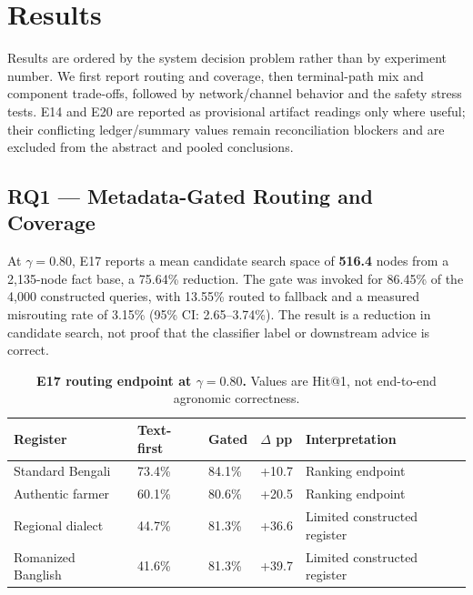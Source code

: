 \documentclass[11pt,a4paper]{article}
\begin{document}
\section{Results}
\label{sec:results}

Results are ordered by the system decision problem rather than by experiment number. We first report routing and coverage, then terminal-path mix and component trade-offs, followed by network/channel behavior and the safety stress tests. E14 and E20 are reported as provisional artifact readings only where useful; their conflicting ledger/summary values remain reconciliation blockers and are excluded from the abstract and pooled conclusions.

\subsection{RQ1 --- Metadata-Gated Routing and Coverage}
\label{subsec:e17}
At $\gamma=0.80$, E17 reports a mean candidate search space of \textbf{516.4} nodes from a 2{,}135-node fact base, a 75.64\% reduction. The gate was invoked for 86.45\% of the 4{,}000 constructed queries, with 13.55\% routed to fallback and a measured misrouting rate of 3.15\% (95\% CI: 2.65--3.74\%). The result is a reduction in candidate search, not proof that the classifier label or downstream advice is correct.

\begin{table}[t]
\centering
\small
\caption{\textbf{E17 routing endpoint at $\gamma=0.80$.} Values are Hit@1, not end-to-end agronomic correctness.}
\label{tab:e17}
\begin{tabularx}{\textwidth}{@{} L{3.1cm} C{1.8cm} C{1.8cm} C{1.6cm} Y @{}}
\toprule
\textbf{Register} & \textbf{Text-first} & \textbf{Gated} & \textbf{$\Delta$ pp} & \textbf{Interpretation} \\
\midrule
Standard Bengali & 73.4\% & 84.1\% & +10.7 & Ranking endpoint \\
Authentic farmer & 60.1\% & 80.6\% & +20.5 & Ranking endpoint \\
Regional dialect & 44.7\% & 81.3\% & +36.6 & Limited constructed register \\
Romanized Banglish & 41.6\% & 81.3\% & +39.7 & Limited constructed register \\
\bottomrule
\end{tabularx}
\vspace{-0.5em}
\end{table}
\end{document}
